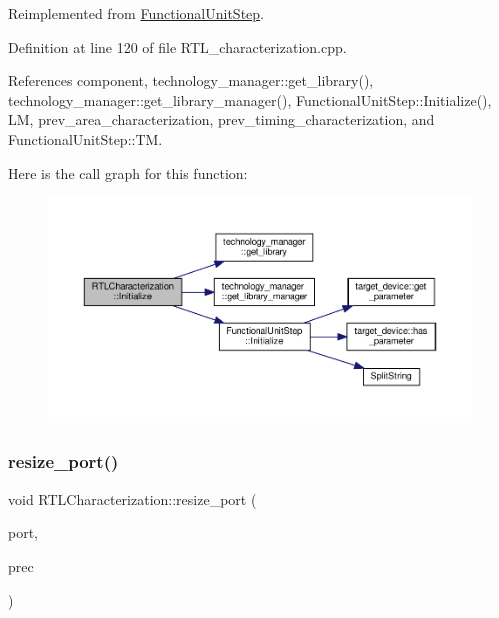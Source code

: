 Reimplemented from \hyperlink{classFunctionalUnitStep_a7957c47789e5d4a97eb9315872dc8d37}{Functional\+Unit\+Step}.



Definition at line 120 of file R\+T\+L\+\_\+characterization.\+cpp.



References component, technology\+\_\+manager\+::get\+\_\+library(), technology\+\_\+manager\+::get\+\_\+library\+\_\+manager(), Functional\+Unit\+Step\+::\+Initialize(), LM, prev\+\_\+area\+\_\+characterization, prev\+\_\+timing\+\_\+characterization, and Functional\+Unit\+Step\+::\+TM.

Here is the call graph for this function\+:
\nopagebreak
\begin{figure}[H]
\begin{center}
\leavevmode
\includegraphics[width=350pt]{d9/d84/classRTLCharacterization_a5763e2ae1d1252dedf0b282a55526fd3_cgraph}
\end{center}
\end{figure}
\mbox{\label{classRTLCharacterization_a4f479d21fdda0208fad8b538edccad9c}} 
\subsubsection{\texorpdfstring{resize\+\_\+port()}{resize\_port()}}
{\footnotesize\ttfamily void R\+T\+L\+Characterization\+::resize\+\_\+port (\begin{DoxyParamCaption}\item[{const \hyperlink{structural__objects_8hpp_a8ea5f8cc50ab8f4c31e2751074ff60b2}{structural\+\_\+object\+Ref} \&}]{port,  }\item[{unsigned int}]{prec }\end{DoxyParamCaption})\hspace{0.3cm}{\ttfamily [private]}}



